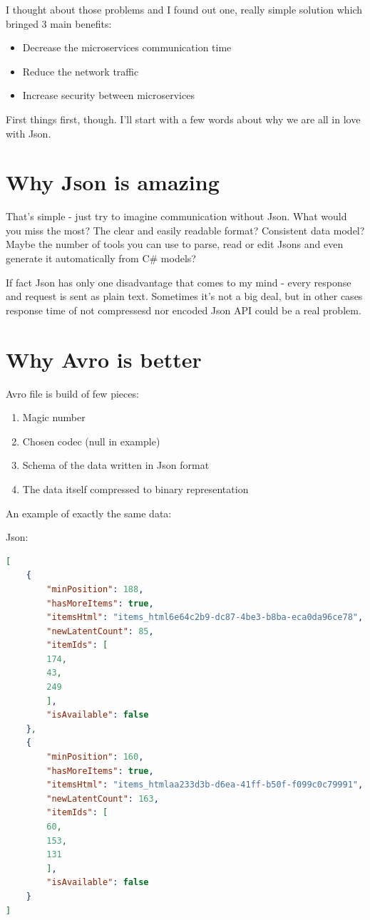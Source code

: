 \documentclass[]{article}
\begin{document}
I thought about those problems and I found out one, really simple solution which bringed 3 main benefits:
\begin{itemize}
	\item Decrease the microservices communication time
	\item Reduce the network traffic 
	\item Increase security between microservices
\end{itemize}


First things first, though. I'll start with a few words about why we are all in love with Json.


\section{Why Json is amazing}
That's simple - just try to imagine communication without Json. What would you miss the most? The clear and easily readable format? Consistent data model? Maybe the number of tools you can use to parse, read or edit Jsons and even generate it automatically from C\# models?

If fact Json has only one disadvantage that comes to my mind - every response and request is sent as plain text. Sometimes it's not a big deal, but in other cases response time of not compressesd nor encoded Json API could be a real problem.  

\section{Why Avro is better}

Avro file is build of few pieces:
\begin{enumerate}
	\item Magic number
	\item Chosen codec (null in example)
	\item Schema of the data written in Json format
	\item The data itself compressed to binary representation
\end{enumerate}

An example of exactly the same data:

Json:

\begin{lstlisting}[language=json,firstnumber=1]
[
	{
		"minPosition": 188,
		"hasMoreItems": true,
		"itemsHtml": "items_html6e64c2b9-dc87-4be3-b8ba-eca0da96ce78",
		"newLatentCount": 85,
		"itemIds": [
		174,
		43,
		249
		],
		"isAvailable": false
	},
	{
		"minPosition": 160,
		"hasMoreItems": true,
		"itemsHtml": "items_htmlaa233d3b-d6ea-41ff-b50f-f099c0c79991",
		"newLatentCount": 163,
		"itemIds": [
		60,
		153,
		131
		],
		"isAvailable": false
	}
]
\end{lstlisting}
\end{document}
